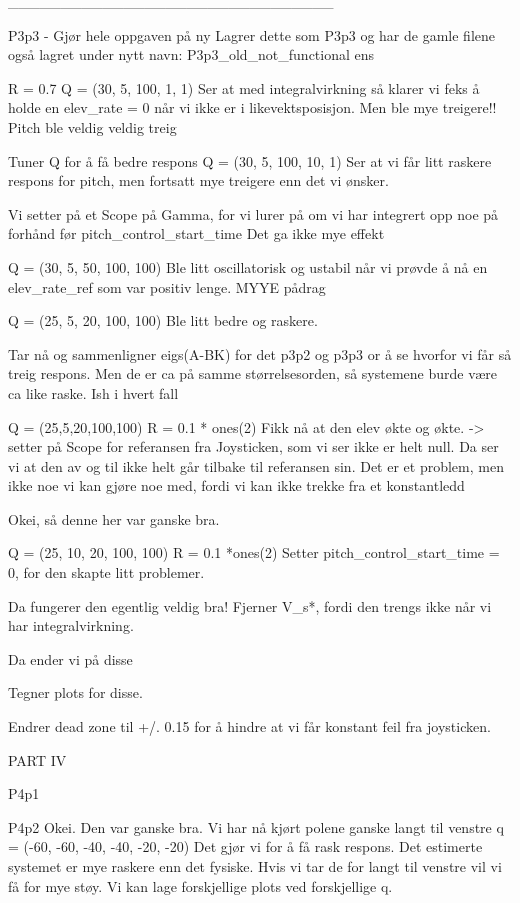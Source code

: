 _______________________________

P3p3 - Gjør hele oppgaven på ny
Lagrer dette som P3p3 og har de gamle filene også lagret under nytt navn: P3p3_old_not_functional ens

R = 0.7
Q = (30, 5, 100, 1, 1) 
Ser at med integralvirkning så klarer vi feks å holde en elev_rate = 0 når vi ikke er i likevektsposisjon. 
Men ble mye treigere!! Pitch ble veldig veldig treig

Tuner Q for å få bedre respons
Q = (30, 5, 100, 10, 1) 
Ser at vi får litt raskere respons for pitch, men fortsatt mye treigere enn det vi ønsker. 

Vi setter på et Scope på Gamma, for vi lurer på om vi har integrert opp noe på forhånd før pitch_control_start_time
Det ga ikke mye effekt

Q = (30, 5, 50, 100, 100)
Ble litt oscillatorisk og ustabil når vi prøvde å nå en elev_rate_ref som var positiv lenge. MYYE pådrag

Q = (25, 5, 20, 100, 100)
Ble litt bedre og raskere.

Tar nå og sammenligner eigs(A-BK) for det p3p2 og p3p3 or å se hvorfor vi får så treig respons. Men de er ca på samme størrelsesorden, så systemene burde være ca like raske. Ish i hvert fall 


Q = (25,5,20,100,100)
R = 0.1 * ones(2)
Fikk nå at den elev økte og økte. -> setter på Scope for referansen fra Joysticken, som vi ser ikke er helt null. Da ser vi at den av og til ikke helt går tilbake til referansen sin. Det er et problem, men ikke noe vi kan gjøre noe med, fordi vi kan ikke trekke fra et konstantledd 


Okei, så denne her var ganske bra. 

Q = (25, 10, 20, 100, 100)
R = 0.1 *ones(2)
Setter pitch_control_start_time = 0, for den skapte litt problemer. 

Da fungerer den egentlig veldig bra!
Fjerner V_s*, fordi den trengs ikke når vi har integralvirkning. 

Da ender vi på disse

Tegner plots for disse. 


Endrer dead zone til +/. 0.15 for å hindre at vi får konstant feil fra joysticken. 




PART IV

P4p1

P4p2
Okei. Den var ganske bra. Vi har nå kjørt polene ganske langt til venstre
q = (-60, -60, -40, -40, -20, -20) 
Det gjør vi for å få rask respons. Det estimerte systemet er mye raskere enn det fysiske. 
Hvis vi tar de for langt til venstre vil vi få for mye støy. 
Vi kan lage forskjellige plots ved forskjellige q. 

